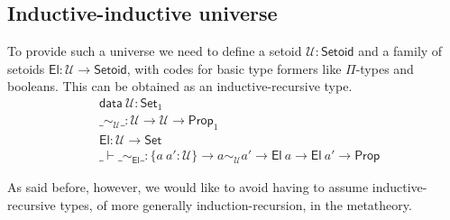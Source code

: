 \documentclass{easychair}
\newcommand{\setoidU}{\mathcal{U}}
\newcommand{\ad}[1]{\AgdaFunction{#1}}
\newcommand{\Set}{\textsf{Set}}
\newcommand{\Prop}{\textsf{Prop}}
\newcommand{\Setoid}{\textsf{Setoid}}
\newcommand{\U}{\textsf{U}}
\newcommand{\El}{\textsf{El}}
\providecommand\mathbbm{\mathbb}
\begin{document}


\subsection{Inductive-inductive universe}

To provide such a universe we need to define a setoid $\setoidU : \Setoid$ and a
family of setoids $\El : \setoidU \to \Setoid$, with codes for basic type
formers like $\Pi$-types and booleans. This can be obtained as an inductive-recursive type.
%
\begin{align*}
  & \textsf{data} \ \setoidU : \Set_1 \\
  & \_\sim_\setoidU\_ : \setoidU \to \setoidU \to \Prop_1 \\
  & \El : \setoidU \to \Set \\
  & \_\vdash\_\sim_\El\_ : \{a\ a' : \setoidU\} \to a \sim_\setoidU a' \to \El\ a \to \El\ a' \to \Prop
\end{align*}

As said before, however, we would like to avoid having to assume
inductive-recursive types, of more generally induction-recursion, in the
metatheory.
\end{document}
